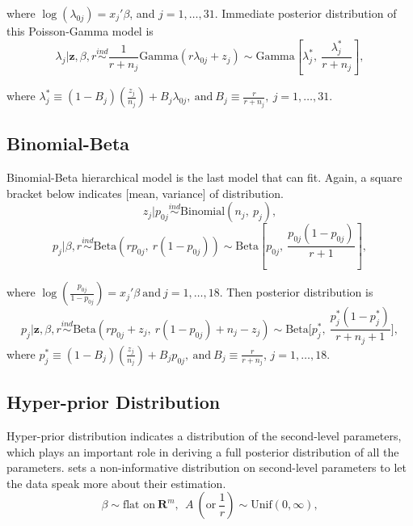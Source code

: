 \documentclass[article]{jss}
\begin{document}
where $\log(\lambda_{0j}) =x_{j}'\beta$, and $j=1, \ldots, 31$. Immediate posterior distribution of this Poisson-Gamma model is
\begin{equation}
\lambda_{j}\vert \textbf{z}, \beta, r \stackrel{ind}{\sim}\frac{1}{r + n_{j}}\textrm{Gamma}(r\lambda_{0j} + z_{j})\sim\textrm{Gamma}[\lambda^{\ast}_{j},~\frac{\lambda^{\ast}_{j}}{r+n_{j}}],
\end{equation}

where $\lambda^{\ast}_{j} \equiv (1-B_{j})(\frac{z_{j}}{n_{j}}) + B_{j}\lambda_{0j},~\textrm{and}~ B_{j}\equiv \frac{r}{r+n_{j}},~ j=1, \ldots, 31$. 

\subsection[Binomial-Beta]{Binomial-Beta}
Binomial-Beta hierarchical model is the last model that  can fit. Again, a square bracket below indicates [mean, variance] of distribution.
\begin{equation}
z_{j} \vert p_{0j}\stackrel{ind}{\sim}\textrm{Binomial}(n_{j}, ~p_{j}),
\end{equation}
\begin{equation}
p_{j} \vert \beta, r\stackrel{ind}{\sim}\textrm{Beta}(rp_{0j},~ r(1-p_{0j}))\sim \textrm{Beta}[p_{0j}, ~\frac{p_{0j}(1-p_{0j})}{r + 1}],
\end{equation}

where $\log(\frac{p_{0j}}{1-p_{0j}}) =x_{j}'\beta~\textrm{and}~j=1, \ldots, 18$. Then posterior distribution is
\begin{equation}
p_{j}\vert \textbf{z}, \beta, r \stackrel{ind}{\sim}\textrm{Beta}(rp_{0j}+z_{j},~r(1-p_{0j})+n_{j}-z_{j})\sim\textrm{Beta}\bigg[p^{\ast}_{j},~ \frac{p^{\ast}_{j}(1-p^{\ast}_{j})}{r+n_{j}+1}\bigg],
\end{equation}
where $p^{\ast}_{j}\equiv(1-B_{j})(\frac{z_{j}}{n_{j}})+B_{j}p_{0j},~ \textrm{and}~ B_{j}\equiv\frac{r}{r+n_{j}}$, $j=1,\ldots,18$.


\subsection[Hyper-prior Distribution]{Hyper-prior Distribution}
Hyper-prior distribution indicates a distribution of the second-level parameters, which plays an important role in deriving a full posterior distribution of all the parameters.  sets a non-informative distribution on second-level parameters to let the data speak more about their estimation.
\begin{equation}
\beta \sim \textrm{flat on}~ \mathbf{R}^{m},~~A ~(\textrm{or}~ \frac{1}{r})\sim \textrm{Unif}(0, \infty),
\end{equation}
\end{document}
